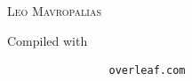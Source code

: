 \documentclass[a4paper]{article}
\numberwithin{equation}{section} %
\begin{document}
\begin{titlepage}
	\vspace{0.5\baselineskip} %
	
	{\scshape\Large Leo Mavropalias \\} %
	
	\vspace{0.5\baselineskip} %
    Compiled with
	
	\vspace{0.5\baselineskip} %
	
    \centering
		\begin{varwidth}{\linewidth}
			\begin{verbatim}
				overleaf.com
			\end{verbatim}
		\end{varwidth}
	
	
	\hfill \break
    \hfill \break
    

\end{titlepage}
\end{document}

